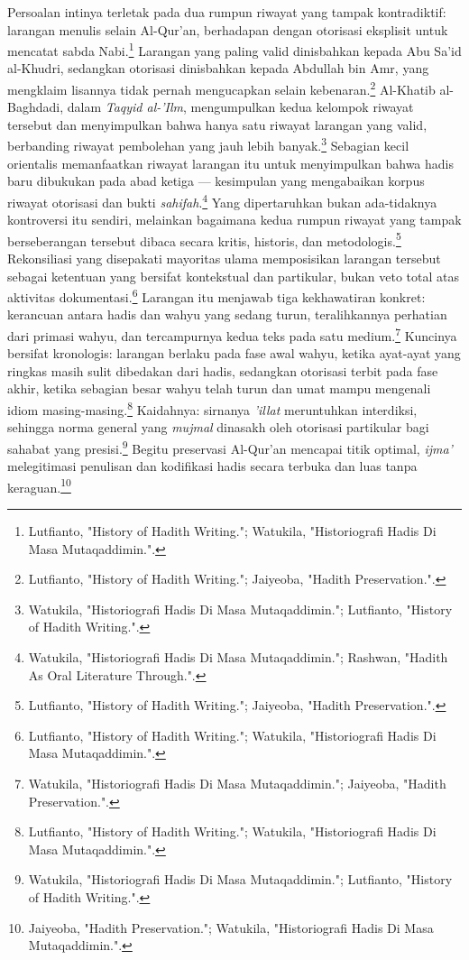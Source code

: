 Persoalan intinya terletak pada dua rumpun riwayat yang tampak kontradiktif: larangan menulis selain Al-Qur'an, berhadapan dengan otorisasi eksplisit untuk mencatat sabda Nabi.\footnote{Lutfianto, "History of Hadith Writing."; Watukila, "Historiografi Hadis Di Masa Mutaqaddimin.".} Larangan yang paling valid dinisbahkan kepada Abu Sa'id al-Khudri, sedangkan otorisasi dinisbahkan kepada Abdullah bin Amr, yang mengklaim lisannya tidak pernah mengucapkan selain kebenaran.\footnote{Lutfianto, "History of Hadith Writing."; Jaiyeoba, "Hadith Preservation.".} Al-Khatib al-Baghdadi, dalam \textit{Taqyid al-'Ilm}, mengumpulkan kedua kelompok riwayat tersebut dan menyimpulkan bahwa hanya satu riwayat larangan yang valid, berbanding riwayat pembolehan yang jauh lebih banyak.\footnote{Watukila, "Historiografi Hadis Di Masa Mutaqaddimin."; Lutfianto, "History of Hadith Writing.".} Sebagian kecil orientalis memanfaatkan riwayat larangan itu untuk menyimpulkan bahwa hadis baru dibukukan pada abad ketiga --- kesimpulan yang mengabaikan korpus riwayat otorisasi dan bukti \textit{sahifah}.\footnote{Watukila, "Historiografi Hadis Di Masa Mutaqaddimin."; Rashwan, "Hadith As Oral Literature Through.".} Yang dipertaruhkan bukan ada-tidaknya kontroversi itu sendiri, melainkan bagaimana kedua rumpun riwayat yang tampak berseberangan tersebut dibaca secara kritis, historis, dan metodologis.\footnote{Lutfianto, "History of Hadith Writing."; Jaiyeoba, "Hadith Preservation.".} Rekonsiliasi yang disepakati mayoritas ulama memposisikan larangan tersebut sebagai ketentuan yang bersifat kontekstual dan partikular, bukan veto total atas aktivitas dokumentasi.\footnote{Lutfianto, "History of Hadith Writing."; Watukila, "Historiografi Hadis Di Masa Mutaqaddimin.".} Larangan itu menjawab tiga kekhawatiran konkret: kerancuan antara hadis dan wahyu yang sedang turun, teralihkannya perhatian dari primasi wahyu, dan tercampurnya kedua teks pada satu medium.\footnote{Watukila, "Historiografi Hadis Di Masa Mutaqaddimin."; Jaiyeoba, "Hadith Preservation.".} Kuncinya bersifat kronologis: larangan berlaku pada fase awal wahyu, ketika ayat-ayat yang ringkas masih sulit dibedakan dari hadis, sedangkan otorisasi terbit pada fase akhir, ketika sebagian besar wahyu telah turun dan umat mampu mengenali idiom masing-masing.\footnote{Lutfianto, "History of Hadith Writing."; Watukila, "Historiografi Hadis Di Masa Mutaqaddimin.".} Kaidahnya: sirnanya \textit{'illat} meruntuhkan interdiksi, sehingga norma general yang \textit{mujmal} dinasakh oleh otorisasi partikular bagi sahabat yang presisi.\footnote{Watukila, "Historiografi Hadis Di Masa Mutaqaddimin."; Lutfianto, "History of Hadith Writing.".} Begitu preservasi Al-Qur'an mencapai titik optimal, \textit{ijma'} melegitimasi penulisan dan kodifikasi hadis secara terbuka dan luas tanpa keraguan.\footnote{Jaiyeoba, "Hadith Preservation."; Watukila, "Historiografi Hadis Di Masa Mutaqaddimin.".}

